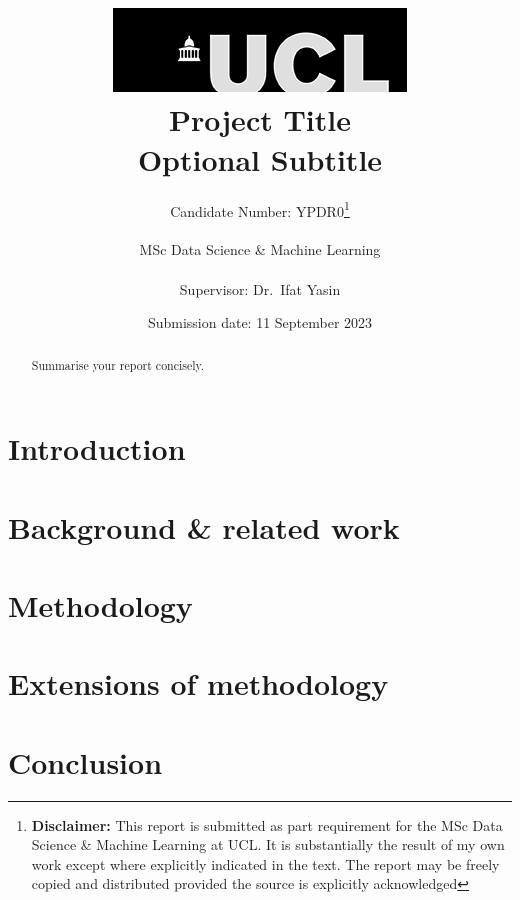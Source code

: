\documentclass[12pt]{report}
\title{  	{ \includegraphics[scale=.5]{ucl_logo.png}}\\
{{\Huge Project Title}}\\
{\large Optional Subtitle}\\}
\date{Submission date: 11 September 2023}
\author{Candidate Number: YPDR0\thanks{
{\bf Disclaimer:}
This report is submitted as part requirement for the MSc Data Science \& Machine
Learning at UCL. It is substantially the result of my own work except where
explicitly indicated in the text. The report may be freely copied and
distributed provided the source is explicitly acknowledged
}
\\ \\
MSc Data Science \& Machine Learning\\ \\
Supervisor: Dr.\ Ifat Yasin}
\begin{document}
 
 \onehalfspacing
\maketitle
\begin{abstract}
Summarise your report concisely.
\end{abstract}
\tableofcontents
\setcounter{page}{1}


\chapter{Introduction}


\chapter{Background \& related work}


\chapter{Methodology}


\chapter{Extensions of methodology}


\chapter{Conclusion}


\appendix



\end{document}
